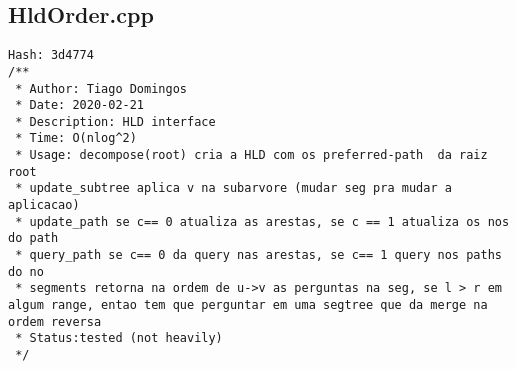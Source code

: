 \documentclass[11pt, a4paper, twoside]{article}
\begin{document}
\subsection{HldOrder.cpp}
\begin{lstlisting}
Hash: 3d4774
/**
 * Author: Tiago Domingos
 * Date: 2020-02-21
 * Description: HLD interface
 * Time: O(nlog^2) 
 * Usage: decompose(root) cria a HLD com os preferred-path  da raiz root
 * update_subtree aplica v na subarvore (mudar seg pra mudar a aplicacao)
 * update_path se c== 0 atualiza as arestas, se c == 1 atualiza os nos do path
 * query_path se c== 0 da query nas arestas, se c== 1 query nos paths do no
 * segments retorna na ordem de u->v as perguntas na seg, se l > r em algum range, entao tem que perguntar em uma segtree que da merge na ordem reversa
 * Status:tested (not heavily)
 */



\end{lstlisting}
\end{document}
